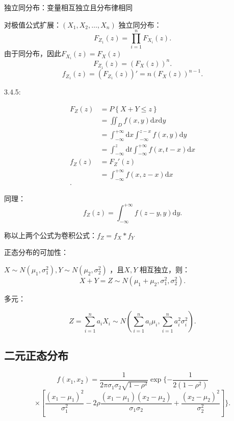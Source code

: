 \begin{notation}
    独立同分布：变量相互独立且分布律相同
\end{notation}
对极值公式扩展：$\left( X_1,X_2,\ldots,X_n \right) $ 独立同分布：
\[
    F_{Z_1}\left( z \right)=\prod_{i=1}^{n} F_{X_i}\left( z \right)  
.\] 
由于同分布，因此$F_{X_i}\left( z \right) =F_{X}\left( z \right) $
\[
    F_{Z_1}\left( z \right)=(F_{X}\left( z \right) ) ^{n}
.\] 
\[
    f_{Z_1}\left( z \right) =\left( F_{Z_1}\left( z \right)  \right) '=n\left( F_{X}\left( z \right)  \right) ^{n-1}
.\] 
\begin{notation}
    3.4.5:

    \begin{align*}
        F_Z\left( z \right) &=P\left\{ X+Y\le z \right\} \\
        &= \iint_D f\left( x,y \right) \mathrm{d}x\mathrm{d}y \\
        &= \int_{-\infty}^{+\infty} \mathrm{d}x\int_{-\infty}^{z-x} f\left( x,y \right)  \mathrm{d}y \\
        &= \int_{-\infty}^{z} \mathrm{d}t \int_{-\infty}^{+\infty} f\left( x,t-x \right)   \mathrm{d}x \\
        f_Z\left( z \right) &= F_Z'\left( z \right)  \\
        &= \int_{-\infty}^{+\infty} f\left( x,z-x \right)  \mathrm{d}x \\
    .\end{align*}
\end{notation}
同理：\[
    f_Z\left( z \right) =\int_{-\infty}^{+\infty} f\left( z-y,y \right)  \mathrm{d}y
.\] 

称以上两个公式为卷积公式：$f_Z=f_X*f_Y$
\begin{notation}
    正态分布的可加性：

    $X\sim N\left( \mu_1,\sigma_1^2 \right) ,Y\sim N\left( \mu_2,\sigma_2^2 \right) $ ，且$X,Y$ 相互独立，则：\[
        X+Y=Z\sim N\left( \mu_1+\mu_2,\sigma_1^2,\sigma_2^2 \right) 
    .\] 

    多元：

    \[
        Z=\sum_{i=1}^{n} a_iX_i\sim N\left( \sum_{i=1}^{n} a_i\mu_i,\sum_{i=1}^{n} a_i^2\sigma_i^2 \right) 
    .\] 
\end{notation}
\subsection{二元正态分布}%
\label{sub:二元正态分布}
\[
    f( x_1,x_2 ) =\frac{1}{2\pi\sigma_1\sigma_2\sqrt{1-\rho^2} }\exp\{-\frac{1}{2( 1-\rho^2 )}
\] 
\[
     \times \left[ \frac{(x_1-\mu_1)^2}{\sigma_1^2}-2\rho \frac{( x_1-\mu_1 ) ( x_2-\mu_2 ) }{\sigma_1\sigma_2} +\frac{(x_2-\mu_2)^2}{\sigma_2^2}\right]\}
.\] 


